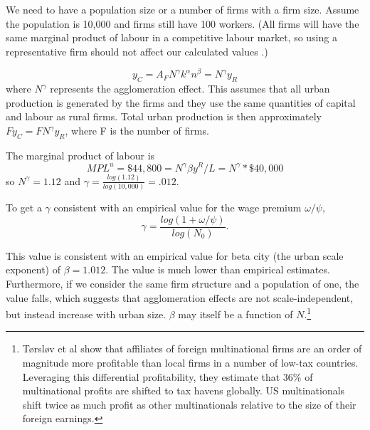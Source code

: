 We need to have a population size or a number of firms with a firm size. Assume the population is 10,000 and firms still have 100 workers. (All firms will have the same marginal product of labour in a competitive labour market, so using a representative firm should not affect our calculated values .)

\[y_C=A_F N^\gamma k^\alpha n^\beta = N^\gamma y_R\]
where $N^\gamma$ represents the agglomeration effect. This assumes that all urban production is generated by the firms and they use the same quantities of capital and labour as rural firms. Total urban production is then approximately $Fy_C=FN^\gamma y_R $, where F is the number of firms.

The marginal product of labour is 
\[MPL^u=\$44,800=N^\gamma \beta y^R/L=N^\gamma *\$40,000\]
so $N^\gamma= 1.12$ and $\gamma = \frac{log(1.12)}{log(10,000)} =.012$. 


To get a  $\gamma$  consistent with an empirical  value for  the wage premium  $\omega / \psi$, 
\begin{equation}
\gamma= \frac{log(1+\omega/\psi)}{log(N_0)}.\label{eqn:gamma-define}
\end{equation}


This value is consistent with an empirical  value for beta city (the urban scale exponent) of $\beta =  1.012$. The value is much lower than empirical estimates. Furthermore, if we consider the same firm structure and a population of one, the value falls, which suggests that agglomeration effects are not scale-independent, but instead increase with urban size. $\beta$ may itself be a function of $N$.\footnote{Tørsløv et al \cite{torslovMissingProfitsNations2023} show that affiliates of foreign multinational firms are an order of magnitude more profitable than local firms in a number of low-tax countries. Leveraging this differential profitability, they estimate that 36\% of multinational profits are shifted to tax havens globally. US multinationals shift twice as much profit as other multinationals relative to the size of their foreign earnings.}










